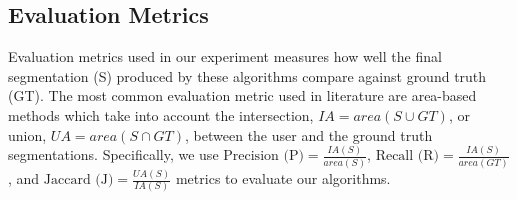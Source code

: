 \subsection{Evaluation Metrics}
   \par Evaluation metrics used in our experiment measures how well the final segmentation (S) produced by these algorithms compare against ground truth (GT). The most common evaluation metric used in literature are area-based methods which take into account the intersection, $IA=area(S\cup GT)$, or union, $UA=area(S\cap GT)$, between the user and the ground truth segmentations. Specifically, we use
    $\text{Precision (P)} = \frac{IA(S)}{area(S)}$, 
    $\text{Recall (R)} = \frac{IA(S)}{area(GT)}$, and 
    $\text{Jaccard (J)} = \frac{UA(S)}{IA(S)}$
    metrics to evaluate our algorithms.